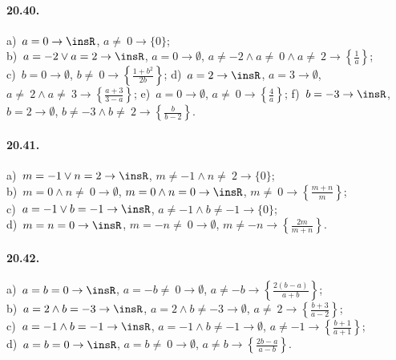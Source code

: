\paragraph{20.40.}
a)~$a=0 \rightarrow \insR$, $a\neq~0 \rightarrow \{0\}$;
\quad \protect\\
b)~$a=-2\vee a=2 \rightarrow \insR$, $a=0 \rightarrow \emptyset$, $a\neq -2\wedge a\neq~0\wedge a\neq~2 \rightarrow \left\{\frac{1}{a}\right\}$;
\quad\protect\\
c)~$b=0 \rightarrow \emptyset$, $b\neq~0 \rightarrow \left\{\frac{1+b^{2}}{2b}\right\}$;
\quad d)~$a=2 \rightarrow \insR$, $a=3 \rightarrow \emptyset$, $a\neq~2\wedge a\neq~3 \rightarrow \left\{\frac{a+3}{3-a}\right\}$;
\quad e)~$a=0 \rightarrow \emptyset$, $a\neq~0 \rightarrow \left\{\frac{4}{a}\right\}$;
\quad f)~$b=-3 \rightarrow \insR$, $b=2 \rightarrow \emptyset$, $b\neq -3\wedge b\neq~2 \rightarrow \left\{\frac{b}{b-2}\right\}$.

\paragraph{20.41.}
a)~$m=-1\vee n=2 \rightarrow \insR$, $m\neq -1\wedge n\neq~2 \rightarrow \{0\}$;
\protect\\
b)~$m=0\wedge n\neq~0 \rightarrow \emptyset$, $m=0\wedge n=0 \rightarrow \insR$, $m\neq~0 \rightarrow \left\{\frac{m+n}{m}\right\}$;
\protect\\
c)~$a=-1\vee b=-1 \rightarrow \insR$, $a\neq -1\wedge b\neq -1 \rightarrow \{0\}$;
\protect\\ d)~$m=n=0 \rightarrow \insR$, $m=-n\neq~0 \rightarrow \emptyset$, $m\neq -n \rightarrow \left\{\frac{2m}{m+n}\right\}$.

\paragraph{20.42.}
a)~$a=b=0 \rightarrow \insR$, $a=-b\neq~0 \rightarrow \emptyset$, $a\neq -b \rightarrow \left\{\frac{2(b-a)}{a+b}\right\}$;
\protect\\ b)~$a=2\wedge b=-3 \rightarrow \insR$, $a=2\wedge b\neq -3 \rightarrow \emptyset$, $a\neq~2 \rightarrow \left\{\frac{b+3}{a-2}\right\}$;
\protect\\ c)~$a=-1\wedge b=-1 \rightarrow \insR$, $a=-1\wedge b\neq -1 \rightarrow \emptyset$, $a\neq -1 \rightarrow \left\{\frac{b+1}{a+1}\right\}$;
\protect\\ d)~$a=b=0 \rightarrow \insR$, $a=b\neq~0 \rightarrow \emptyset$, $a\neq b \rightarrow \left\{\frac{2b-a}{a-b}\right\}$.

